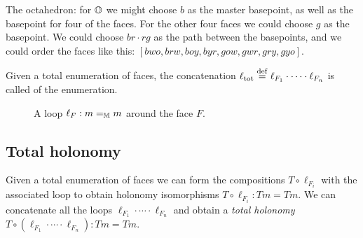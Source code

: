 \begin{myex}
The octahedron: for \( \mathbb{O} \) we might choose \( b \) as the master basepoint, as well as the basepoint for four of the faces. For the other four faces we could choose \( g \) as the basepoint. We could choose \( br\cdot rg \) as the path between the basepoints, and we could order the faces like this: \( [bwo, brw, boy, byr, gow, gwr, gry, gyo] \).
\end{myex}

\begin{mydef}
Given a total enumeration of faces, the concatenation \( \ell_{\mathrm{tot}}\stackrel{\mathrm{def}}{=}\ell_{F_1}\cdot\cdots\cdot\ell_{F_n} \) is called  of the enumeration.
\end{mydef}

\begin{figure}[h]
\centering
{}
\caption{A loop \( \ell_F:m=_{\mathbb{M}} m \) around the face \( F \).}
\label{fig:lasso}
\end{figure}


\subsection{Total holonomy}
Given a total enumeration of faces we can form the compositions \( T\circ\ell_{F_i} \) with the associated loop to obtain holonomy isomorphisms \( T\circ\ell_{F_i}:Tm=Tm \). We can concatenate all the loops \( \ell_{F_1}\cdot\cdots\cdot\ell_{F_n} \) and obtain a \emph{total holonomy} \( T\circ(\ell_{F_1}\cdot\cdots\cdot\ell_{F_n}):Tm=Tm  \).

